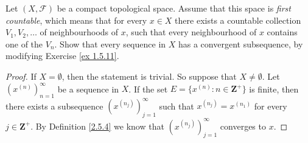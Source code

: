 \setcounter{exercise}{8}
\begin{exercise}\label{ex 2.5.9}
    Let \((X, \mathcal{F})\) be a compact topological space.
    Assume that this space is \emph{first countable}, which means that for every \(x \in X\) there exists a countable collection \(V_1 , V_2 , \dots\) of neighbourhoods of \(x\), such that every neighbourhood of \(x\) contains one of the \(V_n\).
    Show that every sequence in \(X\) has a convergent subsequence, by modifying Exercise \ref{ex 1.5.11}.
\end{exercise}

\begin{proof}
    If \(X = \emptyset\), then the statement is trivial.
    So suppose that \(X \neq \emptyset\).
    Let \((x^{(n)})_{n = 1}^\infty\) be a sequence in \(X\).
    If the set \(E = \{x^{(n)} : n \in \mathbf{Z}^+\}\) is finite, then there exists a subsequence \((x^{(n_j)})_{j = 1}^\infty\) such that \(x^{(n_j)} = x^{(n_1)}\) for every \(j \in \mathbf{Z}^+\).
    By Definition \ref{2.5.4} we know that \((x^{(n_j)})_{j = 1}^\infty\) converges to \(x\).


\end{proof}
